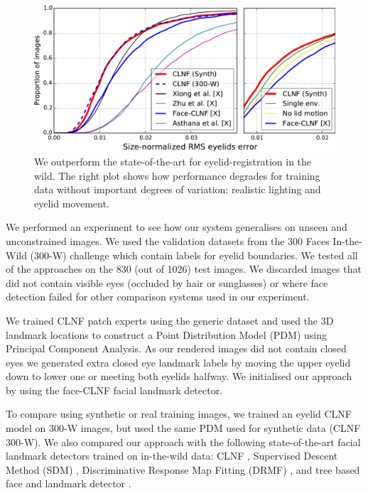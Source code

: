\begin{figure}
    \centering
    \includegraphics[width=\columnwidth]{figs/CLNF_300W_experiment.pdf}
    \caption{We outperform the state-of-the-art for eyelid-registration in the wild. The right plot shows how performance degrades for training data without important degrees of variation: realistic lighting and eyelid movement.}
    \label{fig:clnf_results_wild}
\end{figure}

% 

We performed an experiment to see how our system generalises on unseen and unconstrained images. We used the validation datasets from the 300 Faces In-the-Wild (300-W) challenge \cite{sagonas2013300} which contain labels for eyelid boundaries. We tested all of the approaches on the 830 (out of 1026) test images. We discarded images that did not contain visible eyes (occluded by hair or sunglasses) or where face detection failed for other comparison systems used in our experiment.

We trained CLNF patch experts using the generic \dataset dataset and used the 3D landmark locations to construct a Point Distribution Model (PDM) using Principal Component Analysis. 
As our rendered images did not contain closed eyes we generated extra closed eye landmark labels by moving the upper eyelid down to lower one or meeting both eyelids halfway.
We initialised our approach by using the face-CLNF \cite{baltrusaitis2013constrained} facial landmark detector.

To compare using synthetic or real training images, we trained an eyelid CLNF model on 300-W images, but used the same PDM used for synthetic data (CLNF 300-W).
We also compared our approach with the following state-of-the-art facial landmark detectors trained on in-the-wild data: CLNF \cite{baltrusaitis2013constrained}, Supervised Descent Method (SDM) \cite{Xiong2013sdm}, Discriminative Response Map Fitting (DRMF) \cite{Asthana2013drmf}, and tree based face and landmark detector \cite{Zhu2012tree}. 

